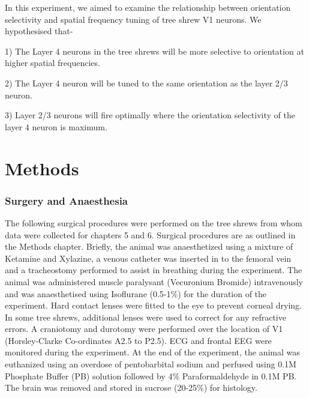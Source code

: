 In this experiment, we aimed to examine the relationship between orientation selectivity and spatial frequency tuning of tree shrew V1 neurons. We hypothesised that-

1) The Layer 4 neurons in the tree shrews will be more selective to orientation at higher spatial frequencies.

2) The Layer 4 neuron will be tuned to the same orientation as the layer 2/3 neuron.

3) Layer 2/3 neurons will fire optimally where the orientation selectivity of the layer 4 neuron is maximum. 

\section{Methods}


\subsubsection{Surgery and Anaesthesia}

The following surgical procedures were performed on the tree shrews from whom data were collected for chapters 5 and 6. Surgical procedures are as outlined in the Methods chapter. Briefly, the animal was anaesthetized using a mixture of Ketamine and Xylazine, a venous catheter was inserted in to the femoral vein and a tracheostomy performed to assist in breathing during the experiment. The animal was administered muscle paralysant (Vecuronium Bromide) intravenously and was anaesthetised using Isoflurane (0.5-1\%) for the duration of the experiment. Hard contact lenses were fitted to the eye to prevent corneal drying. In some tree shrews, additional lenses were used to correct for any refractive errors. A craniotomy and durotomy were performed over the location of V1 (Horsley-Clarke Co-ordinates A2.5 to P2.5). ECG and frontal EEG were monitored during the experiment. At the end of the experiment, the animal was euthanized using an overdose of pentobarbital sodium and perfused using 0.1M Phosphate Buffer (PB) solution followed by 4\% Paraformaldehyde in 0.1M PB. The brain was removed and stored in sucrose (20-25\%) for histology.

